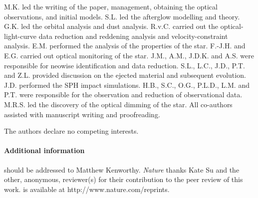\documentclass[sn-nature,oneside]{sn-jnl}%
\begin{document}
M.K. led the writing of the paper, management, obtaining the optical observations, and initial models.
%
S.L. led the afterglow modelling and theory.
%
G.K. led the orbital analysis and dust analysis.
%
R.v.C. carried out the optical-light-curve data reduction and reddening analysis and velocity-constraint analysis.
%
E.M. performed the analysis of the properties of the star.
%
F.-J.H. and E.G. carried out optical monitoring of the star.
%
J.M., A.M., J.D.K. and A.S. were responsible for \gls{neowise} identification and data reduction.
%
S.L., L.C., J.D., P.T. and Z.L. provided discussion on the ejected material and subsequent evolution.
%
J.D. performed the SPH impact simulations.
%
H.B., S.C., O.G., P.L.D., L.M. and P.T. were responsible for the observation and reduction of observational data.
%
M.R.S. led the discovery of the optical dimming of the star.
%
All co-authors assisted with manuscript writing and proofreading.

 The authors declare no competing interests.


\paragraph{Additional information}
\vspace{-0.5ex}
should be addressed to Matthew Kenworthy.
\vspace{-1.5ex}
\textit{Nature} thanks Kate Su and the other, anonymous, reviewer(s) for their contribution to the peer review of this work.
\vspace{-1.5ex}
 is available at http://www.nature.com/reprints.

\end{document}
